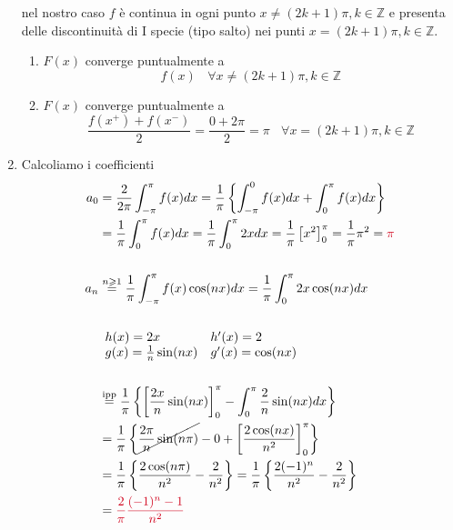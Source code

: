 \begin{enumerate}
nel nostro caso $f$ è continua in ogni punto $x\neq ( 2k+1) \pi ,k\in \mathbb{Z}$ e presenta delle discontinuità di I specie (tipo salto) nei punti $x=( 2k+1) \pi ,k\in \mathbb{Z}$.
\begin{enumerate}
\item $F( x)$ converge puntualmente a\begin{equation*}
f( x) \ \ \ \ \forall x\neq ( 2k+1) \pi ,k\in \mathbb{Z}
\end{equation*}
\item $F( x)$ converge puntualmente a\begin{equation*}
\frac{f\left( x^{+}\right) +f\left( x^{-}\right)}{2} =\frac{0+2\pi }{2} =\pi \ \ \ \ \forall x=( 2k+1) \pi ,k\in \mathbb{Z}
\end{equation*}
\end{enumerate}
\item Calcoliamo i coefficienti\begin{align*}
a_{0} & =\frac{2}{2\pi }\int ^{\pi }_{-\pi } f( x) dx=\frac{1}{\pi }\left\{\int ^{0}_{-\pi } f( x) dx+\int ^{\pi }_{0} f( x) dx\right\}\\
 & =\frac{1}{\pi }\int ^{\pi }_{0} f( x) dx=\frac{1}{\pi }\int ^{\pi }_{0} 2xdx=\frac{1}{\pi }\left[ x^{2}\right]^{\pi }_{0} =\frac{1}{\pi } \pi ^{2} =\textcolor[rgb]{0.82,0.01,0.11}{\pi }\\
 & \\
a_{n} & \overset{n\geqslant 1}{=}\frac{1}{\pi }\int ^{\pi }_{-\pi } f( x)\cos( nx) dx=\frac{1}{\pi }\int ^{\pi }_{0} 2x\cos( nx) dx\\
 & \\
 & \begin{array}{ l l }
h( x) =2x & h'( x) =2\\
g( x) =\frac{1}{n}\sin( nx) & g'( x) =\cos( nx)
\end{array}\\
 & \\
 & \overset{\text{ipp}}{=}\frac{1}{\pi }\left\{\left[\frac{2x}{n}\sin( nx)\right]^{\pi }_{0} -\int ^{\pi }_{0}\frac{2}{n}\sin( nx) dx\right\}\\
 & =\frac{1}{\pi }\left\{\cancel{\frac{2\pi }{n}\sin( n\pi )} -0+\left[\frac{2\cos( nx)}{n^{2}}\right]^{\pi }_{0}\right\}\\
 & =\frac{1}{\pi }\left\{\frac{2\cos( n\pi )}{n^{2}} -\frac{2}{n^{2}}\right\} =\frac{1}{\pi }\left\{\frac{2( -1)^{n}}{n^{2}} -\frac{2}{n^{2}}\right\}\\
 & =\textcolor[rgb]{0.82,0.01,0.11}{\frac{2}{\pi }}\textcolor[rgb]{0.82,0.01,0.11}{\frac{( -1)^{n} -1}{n^{2}}}\\

\end{align*}
\end{enumerate}
